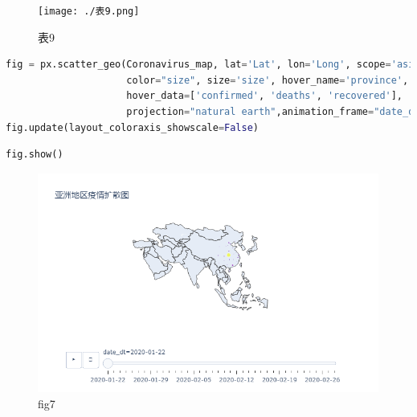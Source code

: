 \documentclass[UTF8,a4paper,12pt]{ctexart}  %
\begin{document}
\begin{figure}
\centering
\texttt{[image: ./表9.png]}
\caption{表9}
\end{figure}

\begin{lstlisting}[language=Python]
fig = px.scatter_geo(Coronavirus_map, lat='Lat', lon='Long', scope='asia',
                     color="size", size='size', hover_name='province',
                     hover_data=['confirmed', 'deaths', 'recovered'],
                     projection="natural earth",animation_frame="date_dt",title='亚洲地区疫情扩散图')
fig.update(layout_coloraxis_showscale=False)
\end{lstlisting}

\begin{lstlisting}[language=Python]
fig.show()
\end{lstlisting}

\begin{figure}
\centering
\includegraphics{./fig7.png}
\caption{fig7}
\end{figure}
\end{document}
